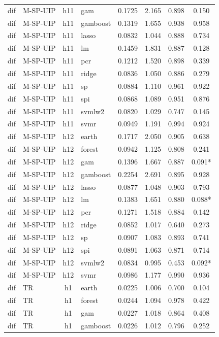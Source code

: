 \begin{ThreePartTable}
\begin{longtable}[t]{llclcccc}
dif & M-SP-UIP & h11 & gam & 0.1725 & 2.165 & 0.898 & 0.150\\
dif & M-SP-UIP & h11 & gamboost & 0.1319 & 1.655 & 0.938 & 0.958\\
dif & M-SP-UIP & h11 & lasso & 0.0832 & 1.044 & 0.888 & 0.734\\
dif & M-SP-UIP & h11 & lm & 0.1459 & 1.831 & 0.887 & 0.128\\
dif & M-SP-UIP & h11 & pcr & 0.1212 & 1.520 & 0.898 & 0.339\\
dif & M-SP-UIP & h11 & ridge & 0.0836 & 1.050 & 0.886 & 0.279\\
dif & M-SP-UIP & h11 & sp & 0.0884 & 1.110 & 0.961 & 0.922\\
dif & M-SP-UIP & h11 & spi & 0.0868 & 1.089 & 0.951 & 0.876\\
dif & M-SP-UIP & h11 & svmlw2 & 0.0820 & 1.029 & 0.747 & 0.145\\
dif & M-SP-UIP & h11 & svmr & 0.0949 & 1.191 & 0.994 & 0.924\\
\addlinespace
dif & M-SP-UIP & h12 & earth & 0.1717 & 2.050 & 0.905 & 0.638\\
dif & M-SP-UIP & h12 & forest & 0.0942 & 1.125 & 0.808 & 0.241\\
dif & M-SP-UIP & h12 & gam & 0.1396 & 1.667 & 0.887 & 0.091*\\
dif & M-SP-UIP & h12 & gamboost & 0.2254 & 2.691 & 0.895 & 0.928\\
dif & M-SP-UIP & h12 & lasso & 0.0877 & 1.048 & 0.903 & 0.793\\
dif & M-SP-UIP & h12 & lm & 0.1383 & 1.651 & 0.880 & 0.088*\\
dif & M-SP-UIP & h12 & pcr & 0.1271 & 1.518 & 0.884 & 0.142\\
dif & M-SP-UIP & h12 & ridge & 0.0852 & 1.017 & 0.640 & 0.273\\
dif & M-SP-UIP & h12 & sp & 0.0907 & 1.083 & 0.893 & 0.741\\
dif & M-SP-UIP & h12 & spi & 0.0891 & 1.063 & 0.871 & 0.714\\
dif & M-SP-UIP & h12 & svmlw2 & 0.0834 & 0.995 & 0.453 & 0.092*\\
dif & M-SP-UIP & h12 & svmr & 0.0986 & 1.177 & 0.990 & 0.936\\
\addlinespace
dif & TR & h1 & earth & 0.0225 & 1.006 & 0.700 & 0.104\\
dif & TR & h1 & forest & 0.0244 & 1.094 & 0.978 & 0.422\\
dif & TR & h1 & gam & 0.0227 & 1.018 & 0.864 & 0.408\\
dif & TR & h1 & gamboost & 0.0226 & 1.012 & 0.796 & 0.252\\

\end{longtable}
\end{ThreePartTable}
